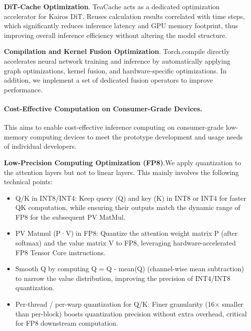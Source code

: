\textbf {DiT-Cache Optimization}. TeaCache acts as a dedicated optimization accelerator for Kairos DiT. Reuses calculation results correlated with time steps, which significantly reduces inference latency and GPU memory footprint, thus improving overall inference efficiency without altering the model structure.
    
\textbf {Compilation and Kernel Fusion Optimization}. Torch.compile directly accelerates neural network training and inference by automatically applying graph optimizations, kernel fusion, and hardware-specific optimizations. In addition, we implement a set of dedicated fusion operators to improve performance.
     


\paragraph{Cost-Effective Computation on Consumer-Grade Devices.}
This aims to enable cost-effective inference computing on consumer-grade low-memory computing devices to meet the prototype development and usage needs of individual developers.

\textbf {Low-Precision Computing Optimization (FP8)}.We apply quantization to the attention layers but not to linear layers. This mainly involves the following technical points:

\begin{itemize}
    \item Q/K in INT8/INT4: Keep query (Q) and key (K) in INT8 or INT4 for faster QK computation, while ensuring their outputs match the dynamic range of FP8 for the subsequent PV MatMul.
    
	\item {PV Matmul (P·V) in FP8}: Quantize the attention weight matrix P (after softmax) and the value matrix V to FP8, leveraging hardware-accelerated FP8 Tensor Core instructions.
    
	\item Smooth Q by computing Q = Q - mean(Q) (channel-wise mean subtraction) to narrow the value distribution, improving the precision of INT4/INT8 quantization.
    
	\item Per-thread / per-warp quantization for Q/K: Finer granularity (16× smaller than per-block) boosts quantization precision without extra overhead, critical for FP8 downstream computation.
    
\end{itemize}    
     
